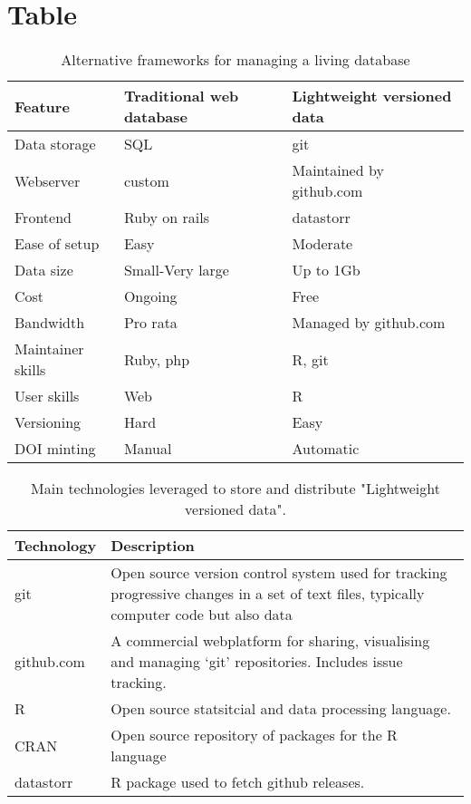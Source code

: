 \documentclass[a4paper,11pt]{article}
\begin{document}
\section{Table}

\begin{table}[h!]
\centering
\caption{Alternative frameworks for managing a living database}
{\footnotesize
\vspace{1cm}
  \begin{tabular}{p{5cm}p{5cm}p{5cm}}
  \hline
  \textbf{Feature} & \textbf{Traditional web database} & \textbf{Lightweight versioned data}\\ \hline
   Data storage     & SQL           &  git       \\
   Webserver        & custom        &  Maintained by github.com\\
   Frontend         & Ruby on rails &  datastorr \\
   Ease of setup    & Easy          & Moderate \\ %
   Data size        & Small-Very large & Up to 1Gb\\
   Cost             & Ongoing       & Free \\
   Bandwidth        & Pro rata      & Managed by github.com\\
   Maintainer skills& Ruby, php     & R, git \\
   User skills      & Web           & R \\
   Versioning       & Hard          & Easy \\
   DOI minting      & Manual        & Automatic \\
  \hline
  \end{tabular}
  }
\label{tab:sql_v_versioneddata}
\end{table}

\newpage

\begin{table}[h!]
\centering
\caption{Main technologies leveraged to store and distribute "Lightweight versioned data".}
{\footnotesize
\vspace{1cm}
  \begin{tabular}{p{5cm}p{10cm}}
  \hline
  \textbf{Technology} & \textbf{Description} \\\hline
   git & Open source version control system used for tracking progressive changes in a set of text files, typically computer code but also data\\
   github.com & A commercial webplatform for sharing, visualising and managing `git' repositories. Includes issue tracking.\\
   R     &  Open source statsitcial and data processing language. \\
   CRAN  &  Open source repository of packages for the R language \\
   datastorr & R package used to fetch github releases. \\
   \hline
  \end{tabular}
  }
\label{tab:technologies}
\end{table}
\end{document}
